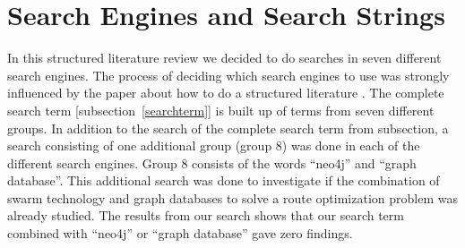\section{Search Engines and Search Strings}
In this structured literature review we decided to do searches in seven different search engines. The process of deciding which search engines to use was strongly influenced by the paper about how to do a structured literature \citep{kofod2014}. The complete search term [subsection~\ref{searchterm}] is built up of terms from seven different groups. In addition to the search of the complete search term from subsection, a search consisting of one additional group (group 8) was done in each of the different search engines. Group 8 consists of the words ``neo4j'' and ``graph database''. This additional search was done to investigate if the combination of swarm technology and graph databases to solve a route optimization problem was already studied. The results from our search shows that our search term combined with ``neo4j'' or ``graph database'' gave zero findings. 


